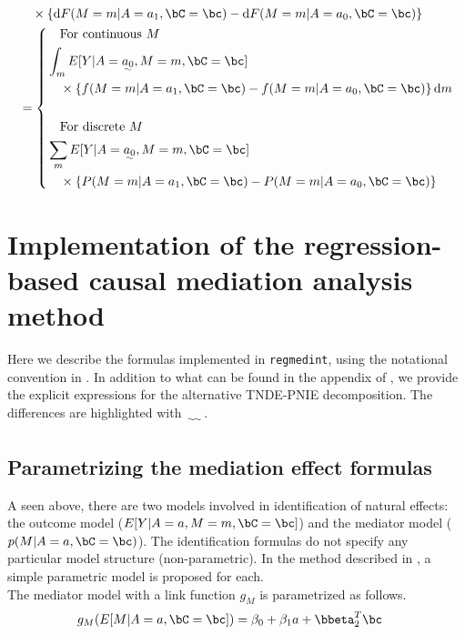 \documentclass[10pt]{article}
\begin{document}
\begin{align*}
  &~~~ \times \left\{ \mathrm{d}F(M = m | A = a_{1}, \bC = \bc) - \mathrm{d}F(M = m | A = a_{0}, \bC = \bc) \right\}\\
  &= \left\{
  \begin{aligned}
  &~~~\text{For continuous }M\\
  &\int_{m} E[Y | A = \uwave{a_{0}}, M = m, \bC = \bc]\\
  &~~~ \times \left\{ f(M = m | A = a_{1}, \bC = \bc) - f(M = m | A = a_{0}, \bC = \bc) \right\} \mathrm{d}m\\
  &\\
  &~~~\text{For discrete }M\\
  &\sum_{m} E[Y | A = \uwave{a_{0}}, M = m, \bC = \bc]\\
  &~~~ \times \left\{ P(M = m | A = a_{1}, \bC = \bc) - P(M = m | A = a_{0}, \bC = \bc) \right\}\\
  \end{aligned}
\right .\\
\end{align*}


\section{Implementation of the regression-based causal mediation analysis method}
\label{sec:orgd630d72}
Here we describe the formulas implemented in \texttt{regmedint}, using the notational convention in \cite{vanderweeleExplanationCausalInference2015,valeriMediationAnalysisAllowing2013,valeriSASMacroCausal2015}. In addition to what can be found in the appendix of \cite{vanderweeleExplanationCausalInference2015}, we provide the explicit expressions for the alternative TNDE-PNIE decomposition. The differences are highlighted with \(\uwave{~~~~}\).

\subsection{Parametrizing the mediation effect formulas}
\label{sec:orgda88f55}
A seen above, there are two models involved in identification of natural effects: the outcome model (\(E[Y|A=a,M=m,\bC=\bc]\)) and the mediator model (\(p(M|A=a,\bC=\bc)\)). The identification formulas do not specify any particular model structure (non-parametric). In the method described in \cite{valeriMediationAnalysisAllowing2013,valeriSASMacroCausal2015}, a simple parametric model is proposed for each.\\

The mediator model with a link function \(g_{M}\) is parametrized as follows.
\begin{align*}
  g_{M}(E[M|A=a,\bC=\bc]) &= \beta_{0} + \beta_{1}a + \bbeta_{2}^{T}\bc
\end{align*}
\end{document}
